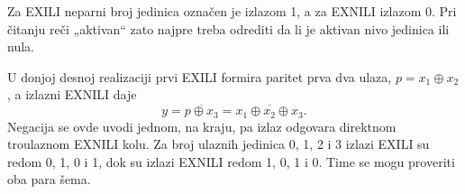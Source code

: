 
Za EXILI neparni broj jedinica označen je izlazom 1, a za EXNILI izlazom 0. Pri čitanju reči „aktivan“ zato najpre treba odrediti da li je aktivan nivo jedinica ili nula.

U donjoj desnoj realizaciji prvi EXILI formira paritet prva dva ulaza, \(p=x_1\oplus x_2\), a izlazni EXNILI daje
\[
y=\overline{p\oplus x_3}
  =\overline{x_1\oplus x_2\oplus x_3}.
\]
Negacija se ovde uvodi jednom, na kraju, pa izlaz odgovara direktnom troulaznom EXNILI kolu. Za broj ulaznih jedinica 0, 1, 2 i 3 izlazi EXILI su redom 0, 1, 0 i 1, dok su izlazi EXNILI redom 1, 0, 1 i 0. Time se mogu proveriti oba para šema.

